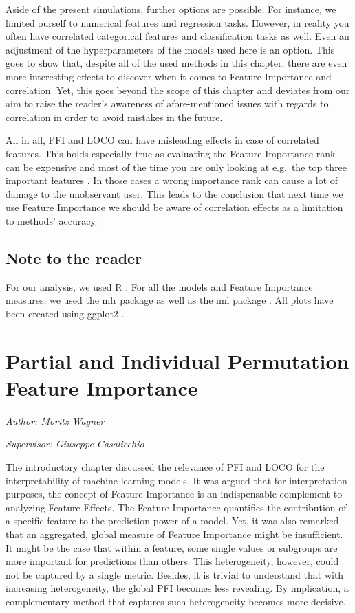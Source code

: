 \documentclass[]{krantz}
\begin{document}
Aside of the present simulations, further options are possible. For
instance, we limited ourself to numerical features and regression tasks.
However, in reality you often have correlated categorical features and
classification tasks as well. Even an adjustment of the hyperparameters
of the models used here is an option. This goes to show that, despite
all of the used methods in this chapter, there are even more interesting
effects to discover when it comes to Feature Importance and correlation.
Yet, this goes beyond the scope of this chapter and deviates from our
aim to raise the reader's awareness of afore-mentioned issues with
regards to correlation in order to avoid mistakes in the future.

All in all, PFI and LOCO can have misleading effects in case of
correlated features. This holds especially true as evaluating the
Feature Importance rank can be expensive and most of the time you are
only looking at e.g.~the top three important features
\citep{molnar2019}. In those cases a wrong importance rank can cause a
lot of damage to the unobservant user. This leads to the conclusion that
next time we use Feature Importance we should be aware of correlation
effects as a limitation to methods' accuracy.

\section{Note to the reader}\label{note-to-the-reader}

For our analysis, we used R \citep{R-base}. For all the models and
Feature Importance measures, we used the mlr package \citep{R-mlr} as
well as the iml package \citep{molnar2018iml}. All plots have been
created using ggplot2 \citep{R-ggplot2}.

\chapter{Partial and Individual Permutation Feature
Importance}\label{pfi-partial}

\emph{Author: Moritz Wagner}

\emph{Supervisor: Giuseppe Casalicchio}

The introductory chapter discussed the relevance of PFI and LOCO for the
interpretability of machine learning models. It was argued that for
interpretation purposes, the concept of Feature Importance is an
indispensable complement to analyzing Feature Effects. The Feature
Importance quantifies the contribution of a specific feature to the
prediction power of a model. Yet, it was also remarked that an
aggregated, global measure of Feature Importance might be insufficient.
It might be the case that within a feature, some single values or
subgroups are more important for predictions than others. This
heterogeneity, however, could not be captured by a single metric.
Besides, it is trivial to understand that with increasing heterogeneity,
the global PFI becomes less revealing. By implication, a complementary
method that captures such heterogeneity becomes more decisive.
\end{document}
